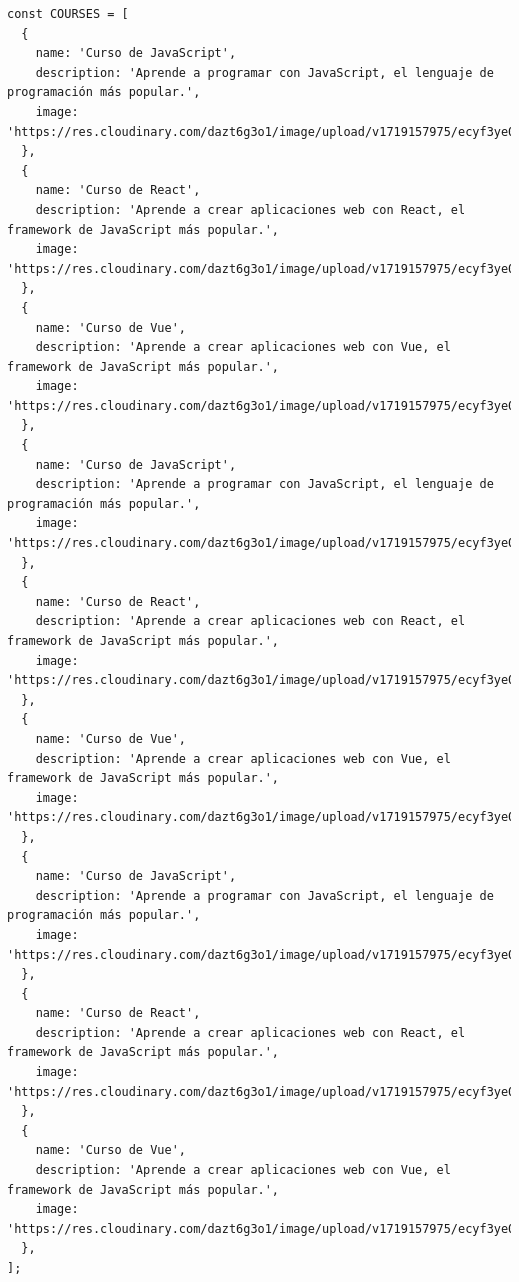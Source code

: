 \begin{itemize}
\begin{itemize}
\begin{verbatim}
const COURSES = [
  {
    name: 'Curso de JavaScript',
    description: 'Aprende a programar con JavaScript, el lenguaje de programación más popular.',
    image: 'https://res.cloudinary.com/dazt6g3o1/image/upload/v1719157975/ecyf3ye0dnn5hbgydsjx.png',
  },
  {
    name: 'Curso de React',
    description: 'Aprende a crear aplicaciones web con React, el framework de JavaScript más popular.',
    image: 'https://res.cloudinary.com/dazt6g3o1/image/upload/v1719157975/ecyf3ye0dnn5hbgydsjx.png',
  },
  {
    name: 'Curso de Vue',
    description: 'Aprende a crear aplicaciones web con Vue, el framework de JavaScript más popular.',
    image: 'https://res.cloudinary.com/dazt6g3o1/image/upload/v1719157975/ecyf3ye0dnn5hbgydsjx.png',
  },
  {
    name: 'Curso de JavaScript',
    description: 'Aprende a programar con JavaScript, el lenguaje de programación más popular.',
    image: 'https://res.cloudinary.com/dazt6g3o1/image/upload/v1719157975/ecyf3ye0dnn5hbgydsjx.png',
  },
  {
    name: 'Curso de React',
    description: 'Aprende a crear aplicaciones web con React, el framework de JavaScript más popular.',
    image: 'https://res.cloudinary.com/dazt6g3o1/image/upload/v1719157975/ecyf3ye0dnn5hbgydsjx.png',
  },
  {
    name: 'Curso de Vue',
    description: 'Aprende a crear aplicaciones web con Vue, el framework de JavaScript más popular.',
    image: 'https://res.cloudinary.com/dazt6g3o1/image/upload/v1719157975/ecyf3ye0dnn5hbgydsjx.png',
  },
  {
    name: 'Curso de JavaScript',
    description: 'Aprende a programar con JavaScript, el lenguaje de programación más popular.',
    image: 'https://res.cloudinary.com/dazt6g3o1/image/upload/v1719157975/ecyf3ye0dnn5hbgydsjx.png',
  },
  {
    name: 'Curso de React',
    description: 'Aprende a crear aplicaciones web con React, el framework de JavaScript más popular.',
    image: 'https://res.cloudinary.com/dazt6g3o1/image/upload/v1719157975/ecyf3ye0dnn5hbgydsjx.png',
  },
  {
    name: 'Curso de Vue',
    description: 'Aprende a crear aplicaciones web con Vue, el framework de JavaScript más popular.',
    image: 'https://res.cloudinary.com/dazt6g3o1/image/upload/v1719157975/ecyf3ye0dnn5hbgydsjx.png',
  },
];


\end{verbatim}
\end{itemize}
\end{itemize}
